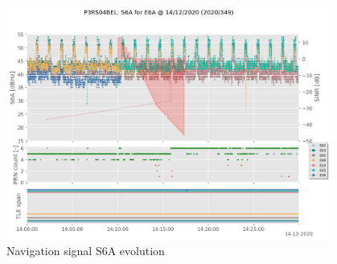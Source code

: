 \begin{enumerate}
\begin{figure}[H]%
\centering%
\includegraphics[width=0.95\textwidth]{png/P3RS04BEL_R_20203490000_01D_00U_MO_E-E6A-S6A.png}%
\caption{\label{fig:tle_navsig_ES6A} Navigation signal S6A evolution}%
\end{figure}


\end{enumerate}

